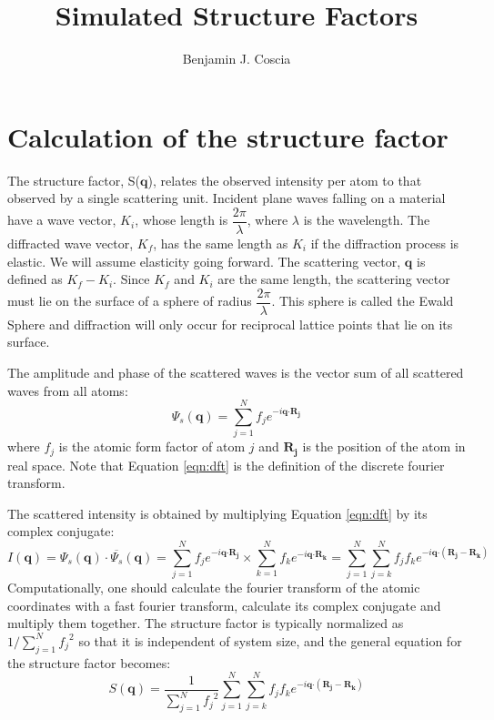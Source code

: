 \documentclass{article}
\title{Simulated Structure Factors}
\author{Benjamin J. Coscia}
\begin{document}
  
  \graphicspath{{./figures/}}
  \maketitle

  \section{Calculation of the structure factor}

  The structure factor, S($\mathbf{q}$), relates the observed intensity per
  atom to that observed by a single scattering unit. Incident plane waves falling
  on a material have a wave vector, $K_i$, whose length is
  $\dfrac{2\pi}{\lambda}$, where $\lambda$ is the wavelength. The diffracted wave
  vector, $K_f$, has the same length as $K_i$ if the diffraction process is 
  elastic. We will assume elasticity going forward. The scattering vector, $\mathbf{q}$
  is defined as $K_f - K_i$. Since $K_f$ and $K_i$ are the same length, the scattering
  vector must lie on the surface of a sphere of radius $\dfrac{2\pi}{\lambda}$. This
  sphere is called the Ewald Sphere and diffraction will only occur for reciprocal
  lattice points that lie on its surface. 

  The amplitude and phase of the scattered waves is the vector sum of all scattered 
  waves from all atoms:
  \begin{equation}
  \Psi_s(\mathbf{q}) = \sum_{j=1}^{N}f_je^{-i\mathbf{q}\boldsymbol{\cdot}\mathbf{R_j}}\label{eqn:dft}
  \end{equation}
  where $f_j$ is the atomic form factor of atom $j$ and $\mathbf{R_j}$ is the position of
  the atom in real space. Note that Equation \ref{eqn:dft} is the definition of the 
  discrete fourier transform.

  The scattered intensity is obtained by multiplying Equation \ref{eqn:dft} by its 
  complex conjugate:
  \begin{equation}
  I(\mathbf{q}) = \Psi_s(\mathbf{q})\cdot\overline{\Psi_s}(\mathbf{q}) = \sum_{j=1}^{N}f_je^{-i\mathbf{q}\boldsymbol{\cdot}\mathbf{R_j}} \times \sum_{k=1}^{N}f_ke^{-i\mathbf{q}\boldsymbol{\cdot}\mathbf{R_k}} = \sum_{j=1}^{N}\sum_{j=k}^{N}f_jf_ke^{-i\mathbf{q}\boldsymbol{\cdot}(\mathbf{R_j}- \mathbf{R_k})}
  \label{eqn:conjugate}
  \end{equation}
  Computationally, one should calculate the fourier transform of the atomic
  coordinates with a fast fourier transform, calculate its complex conjugate and 
  multiply them together. The structure factor is typically normalized as 
  $ 1 / {\sum_{j=1}^{N} {f_j}^2}$ so that it is independent of system size, and
  the general equation for the structure factor becomes:
  \begin{equation}
  S(\mathbf{q})= \dfrac{1}{\sum_{j=1}^{N} {f_j}^2}\sum_{j=1}^{N}\sum_{j=k}^{N}f_jf_ke^{-i\mathbf{q}\boldsymbol{\cdot}(\mathbf{R_j}- \mathbf{R_k})}
  \label{eqn:general_sf}
  \end{equation}
 
\end{document}
